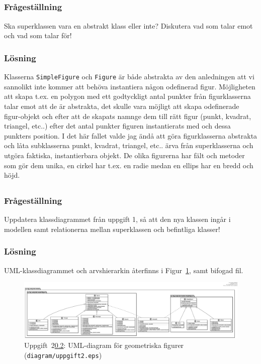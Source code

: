 \subsection{}\label{sec:uppg2b}
\subsubsection*{Frågeställning}
Ska superklassen vara en abstrakt klass eller inte? Diskutera vad som talar
emot och vad som talar för!

\subsubsection*{Lösning}
Klasserna \texttt{SimpleFigure} och \texttt{Figure} är både abstrakta av den
anledningen att vi sannolikt inte kommer att behöva instantiera någon odefinerad
figur. Möjligheten att skapa t.ex. en polygon med ett godtyckligt antal punkter
från figurklasserna talar emot att de är abstrakta, det skulle vara möjligt att
skapa odefinerade figur-objekt och efter att de skapats namnge dem till 
rätt figur (punkt, kvadrat, triangel, etc..) efter det antal punkter figuren 
instantierats med och dessa punkters position.
I det här fallet valde jag ändå att göra figurklasserna abstrakta och låta
subklasserna punkt, kvadrat, triangel, etc.. ärva från superklasserna och
utgöra faktiska, instantierbara objekt.
De olika figurerna har fält och metoder som gör dem unika, en cirkel har t.ex.
en radie medan en ellips har en bredd och höjd.


\subsection{}\label{sec:uppg2c}
\subsubsection*{Frågeställning}
Uppdatera klassdiagrammet från uppgift 1, så att den nya klassen ingår i
modellen samt relationerna mellan superklassen och befintliga klasser!

\subsubsection*{Lösning}
\par UML-klassdiagrammet och arvshierarkin återfinns i Figur~\ref{fig:uppg2a},
 samt bifogad fil.

\begin{figure}
\centering
\includegraphics[width=\linewidth]{diagram/uppgift2.eps}
\caption{Uppgift~2\ref{sec:uppg2c}: UML-diagram för geometriska figurer
(\texttt{diagram/uppgift2.eps})}
\label{fig:uppg2a}
\end{figure}



